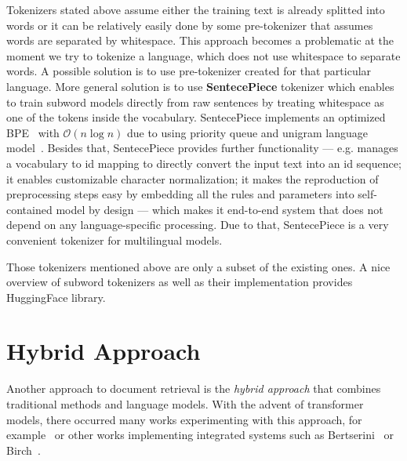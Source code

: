    Tokenizers stated above assume either the training text is already splitted into words or it can be relatively easily done by some pre-tokenizer that assumes words are separated by whitespace. This approach becomes a problematic at the moment we try to tokenize a language, which does not use whitespace to separate words. A possible solution is to use pre-tokenizer created for that particular language. More general solution is to use \textbf{SentecePiece} tokenizer which enables to train subword models directly from raw sentences by treating whitespace as one of the tokens inside the vocabulary. SentecePiece implements an optimized BPE~\parencite{BPE-tokenizer} with $\mathcal{O}(n\log n)$ due to using priority queue and unigram language model~\parencite{unigram-toknizer}. Besides that, SentecePiece provides further functionality --- e.g. manages a vocabulary to id mapping to directly convert the input text into an id sequence; it enables customizable character normalization; it makes the reproduction of preprocessing steps easy by embedding all the rules and parameters into self-contained model by design --- which makes it end-to-end system that does not depend on any language-specific processing. Due to that, SentecePiece is a very convenient tokenizer for multilingual models.
    
    Those tokenizers mentioned above are only a subset of the existing ones. A nice overview of subword tokenizers as well as their implementation provides HuggingFace library.~\parencite{wolf-etal-2020-transformers}


\section{Hybrid Approach}
\label{section:hybrid-approach}
    Another approach to document retrieval is the \emph{hybrid approach} that combines traditional methods and language models. With the advent of transformer models, there occurred many works experimenting with this approach, for example~\parencite{nogueira2019passage} or other works implementing integrated systems such as Bertserini~\parencite{bertserini} or Birch~\parencite{birch}.
    
    
